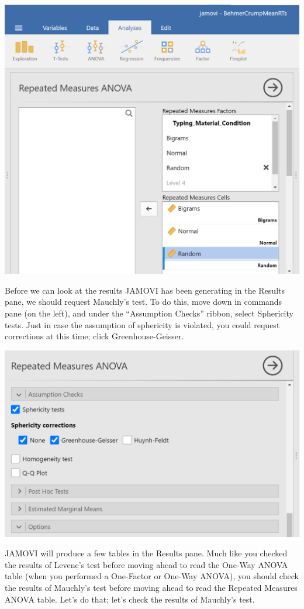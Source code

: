 \documentclass[
]{book}
\begin{document}
\includegraphics{img/RM_ANOVA_RandomMoved.png}

Before we can look at the results JAMOVI has been generating in the Results pane, we should request Mauchly's test. To do this, move down in commands pane (on the left), and under the ``Assumption Checks'' ribbon, select {Sphericity tests}. Just in case the assumption of sphericity is violated, you could request corrections at this time; click {Greenhouse-Geisser}.

\includegraphics{img/RM_ANOVA_Sphericity.png}

JAMOVI will produce a few tables in the Results pane. Much like you checked the results of Levene's test before moving ahead to read the One-Way ANOVA table (when you performed a One-Factor or One-Way ANOVA), you should check the results of Mauchly's test before moving ahead to read the Repeated Measures ANOVA table. Let's do that; let's check the results of Mauchly's test.
\end{document}

